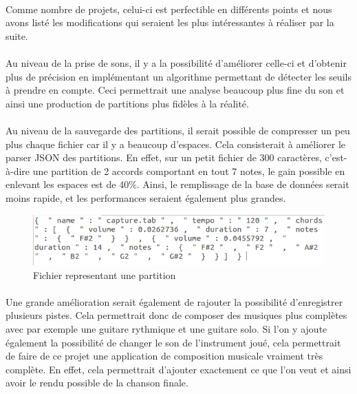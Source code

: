 \paragraph{}
Comme nombre de projets, celui-ci est perfectible en différents points et nous avons listé les modifications qui seraient les plus intéressantes à réaliser par la suite.  

\paragraph{}
Au niveau de la prise de sons, il y a la possibilité d'améliorer celle-ci et d'obtenir plus de précision 
en implémentant un algorithme permettant de détecter les seuils à prendre en compte. Ceci permettrait une analyse beaucoup plus fine du son et ainsi une production de partitions plus fidèles à la réalité.

\paragraph{}
Au niveau de la sauvegarde des partitions, il serait possible de compresser un peu plus chaque fichier 
car il y a beaucoup d'espaces. Cela consisterait à améliorer le parser JSON des partitions. En effet, sur un petit fichier 
de 300 caractères, c'est-à-dire une partition de 2 accords comportant en tout 7 notes, le gain 
possible en enlevant les espaces est de 40\%. Ainsi, le remplissage de la base de données serait moins rapide, 
et les performances seraient également plus grandes.

\begin{figure}[H]
\centering
\includegraphics[scale=0.5]{FichierPartition}
\caption{Fichier representant une partition}
\end{figure}

\paragraph{}
Une grande amélioration serait également de rajouter la possibilité d'enregistrer plusieurs pistes. Cela permettrait donc de 
composer des musiques plus complètes avec par exemple une guitare rythmique et une guitare solo. Si l'on y ajoute également 
la possibilité de changer le son de l'instrument joué, cela permettrait de faire de ce projet une application de 
composition musicale vraiment très complète. En effet, cela permettrait d'ajouter exactement ce que l'on veut et ainsi 
avoir le rendu possible de la chanson finale.

